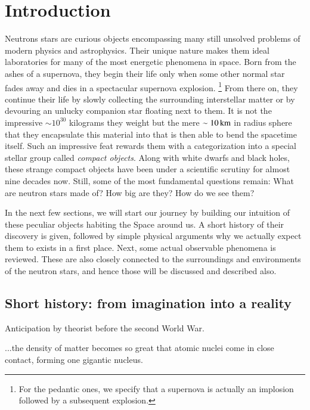 \chapter{Introduction} 
Neutrons stars are curious objects encompassing many still unsolved problems of modern physics and astrophysics.
Their unique nature makes them ideal laboratories for many of the most energetic phenomena in space.
Born from the ashes of a supernova, they begin their life only when some other normal star fades away and dies in a spectacular supernova explosion.%
\footnote{
    For the pedantic ones, we specify that a supernova is actually an implosion followed by a subsequent explosion.}
From there on, they continue their life by slowly collecting the surrounding interstellar matter or by devouring an unlucky companion star floating next to them.
It is not the impressive $\sim 10^{30}$ kilograms they weight but the mere $\sim 10 \, \mathrm{km}$ in radius sphere that they encapsulate this material into that is then able to bend the spacetime itself.
Such an impressive feat rewards them with a categorization into a special stellar group called \textit{compact objects}.
Along with white dwarfs and black holes, these strange compact objects have been under a scientific scrutiny for almost nine decades now.
Still, some of the most fundamental questions remain:
What are neutron stars made of?
How big are they?
How do we see them?

In the next few sections, we will start our journey by building our intuition of these peculiar objects habiting the Space around us.
A short history of their discovery is given, followed by simple physical arguments why we actually expect them to exists in a first place.
Next, some actual observable phenomena is reviewed.
These are also closely connected to the surroundings and environments of the neutron stars, and hence those will be discussed and described also.


\section{Short history: from imagination into a reality}
Anticipation by theorist before the second World War. \cite{Landau32}
\begin{displayquote}[Landau]
...the density of matter becomes so great that atomic nuclei come in close contact, forming one gigantic nucleus.
\end{displayquote}

